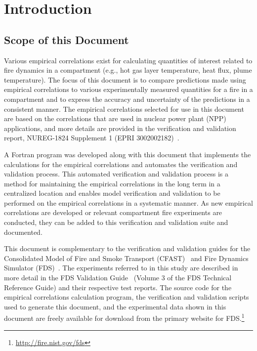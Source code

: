 
\chapter{Introduction}
\label{Introduction_Chapter}

\section{Scope of this Document}

Various empirical correlations exist for calculating quantities of interest related to fire dynamics in a compartment (e.g., hot gas layer temperature, heat flux, plume temperature). The focus of this document is to compare predictions made using empirical correlations to various experimentally measured quantities for a fire in a compartment and to express the accuracy and uncertainty of the predictions in a consistent manner. The empirical correlations selected for use in this document are based on the correlations that are used in nuclear power plant (NPP) applications, and more details are provided in the verification and validation report, NUREG-1824 Supplement 1 (EPRI 3002002182)~\cite{NUREG_1824_Sup_1}.

A Fortran program was developed along with this document that implements the calculations for the empirical correlations and automates the verification and validation process. This automated verification and validation process is a method for maintaining the empirical correlations in the long term in a centralized location and enables model verification and validation to be performed on the empirical correlations in a systematic manner. As new empirical correlations are developed or relevant compartment fire experiments are conducted, they can be added to this verification and validation suite and documented.

This document is complementary to the verification and validation guides for the Consolidated Model of Fire and Smoke Transport (CFAST)~\cite{CFAST_Tech_Guide_6} and Fire Dynamics Simulator (FDS)~\cite{FDS_Verification_Guide, FDS_Validation_Guide}. The experiments referred to in this study are described in more detail in the FDS Validation Guide~\cite{FDS_Validation_Guide} (Volume 3 of the FDS Technical Reference Guide) and their respective test reports. The source code for the empirical correlations calculation program, the verification and validation scripts used to generate this document, and the experimental data shown in this document are freely available for download from the primary website for FDS.\footnote{\href{http://fire.nist.gov/fds}{http://fire.nist.gov/fds}}


